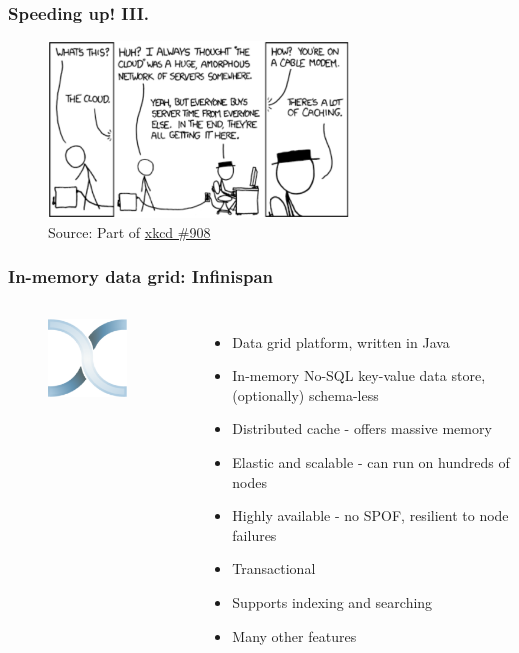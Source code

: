 \documentclass[10pt,utf8]{beamer}
\begin{document}
\begin{frame}
	\frametitle{Speeding up! III.}
	
	 {
		\vspace{0.5cm}
		\vspace{0.5cm}
	
		\begin{figure}
			\centering
			\includegraphics[width=8cm]{./img/xkcd_908.eps}
			\caption{\tiny{Source: Part of \href{http://xkcd.com/908/}{xkcd \#908}}}
		\end{figure}
  }
\end{frame}

\begin{frame}
	\frametitle{In-memory data grid: Infinispan}
	\begin{columns}
		\begin{figure}
			\centering
			\includegraphics[width=3cm]{./img/infinispan.eps}
		\end{figure}
		\centering
		\vspace{0.3cm}
		\textbf{}
		\begin{itemize}
			\item Data grid platform, written in Java
			\item In-memory No-SQL key-value data store, (optionally) schema-less
			\item Distributed cache - offers massive memory
			\item Elastic and scalable - can run on hundreds of nodes
			\item Highly available - no SPOF, resilient to node failures
			\item Transactional
			\item Supports indexing and searching
			\item Many other features
		\end{itemize}
	\end{columns}
\end{frame}
\end{document}
